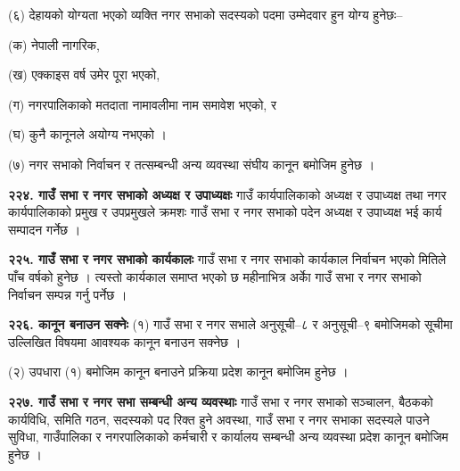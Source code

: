 (६) देहायको योग्यता भएको व्यक्ति नगर सभाको सदस्यको पदमा उम्मेदवार हुन योग्य हुनेछः–

(क) नेपाली नागरिक,

(ख) एक्काइस वर्ष उमेर पूरा भएको,

(ग) नगरपालिकाको मतदाता नामावलीमा नाम समावेश भएको, र

(घ) कुनै कानूनले अयोग्य नभएको ।

(७) नगर सभाको निर्वाचन र तत्सम्बन्धी अन्य व्यवस्था संघीय कानून बमोजिम हुनेछ ।

\textbf{२२४. गाउँ सभा र नगर सभाको अध्यक्ष र उपाध्यक्षः} गाउँ कार्यपालिकाको अध्यक्ष र उपाध्यक्ष तथा नगर कार्यपालिकाको प्रमुख र उपप्रमुखले क्रमशः गाउँ सभा र नगर सभाको पदेन अध्यक्ष र उपाध्यक्ष भई कार्य सम्पादन गर्नेछ ।

\textbf{२२५. गाउँ सभा र नगर सभाको कार्यकालः} गाउँ सभा र नगर सभाको कार्यकाल निर्वाचन भएको मितिले पाँच वर्षको हुनेछ । त्यस्तो कार्यकाल समाप्त भएको छ महीनाभित्र अर्काे गाउँ सभा र नगर सभाको निर्वाचन सम्पन्न गर्नु पर्नेछ ।

\textbf{२२६. कानून बनाउन सक्नेः} (१) गाउँ सभा र नगर सभाले अनुसूची–८ र अनुसूची–९ बमोजिमको सूचीमा उल्लिखित विषयमा आवश्यक कानून बनाउन सक्नेछ ।

(२) उपधारा (१) बमोजिम कानून बनाउने प्रक्रिया प्रदेश कानून बमोजिम हुनेछ ।

\textbf{२२७. गाउँ सभा र नगर सभा सम्बन्धी अन्य व्यवस्थाः} गाउँ सभा र नगर सभाको सञ्चालन, बैठकको कार्यविधि, समिति गठन, सदस्यको पद रिक्त हुने अवस्था, गाउँ सभा र नगर सभाका सदस्यले पाउने सुविधा, गाउँपालिका र नगरपालिकाको कर्मचारी र कार्यालय सम्बन्धी अन्य व्यवस्था प्रदेश कानून बमोजिम हुनेछ ।